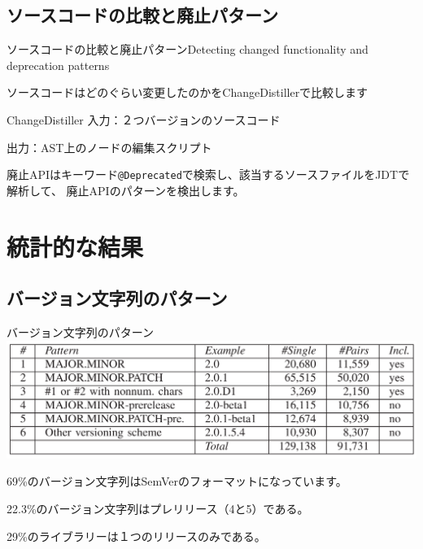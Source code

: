 \subsection{ソースコードの比較と廃止パターン}
\begin{frame}{ソースコードの比較と廃止パターン}{Detecting changed functionality 
and deprecation patterns}

ソースコードはどのぐらい変更したのかをChangeDistillerで比較します

\begin{block}{ChangeDistiller}
入力：２つバージョンのソースコード

出力：AST上のノードの編集スクリプト
\end{block}

\pause\vspace{1em}

廃止APIはキーワード\texttt{@Deprecated}で検索し、該当するソースファイルをJDTで解析して、
廃止APIのパターンを検出します。
\end{frame}
\section{統計的な結果}
\subsection{バージョン文字列のパターン}
\begin{frame}{バージョン文字列のパターン}
\includegraphics[width=\textwidth]{table1}

69\%のバージョン文字列はSemVerのフォーマットになっています。

22.3\%のバージョン文字列はプレリリース（4と5）である。

29\%のライブラリーは１つのリリースのみである。

\end{frame}

